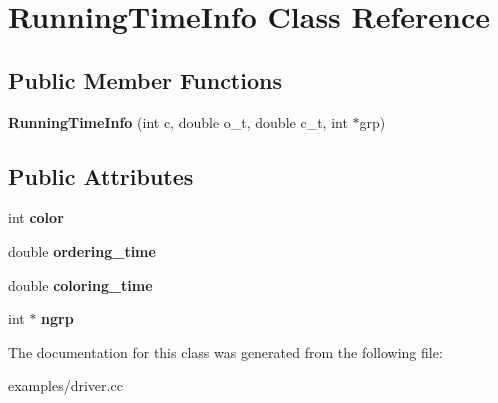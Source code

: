\hypertarget{classRunningTimeInfo}{
\section{RunningTimeInfo Class Reference}
\label{classRunningTimeInfo}
}
\subsection*{Public Member Functions}
\begin{DoxyCompactItemize}
\item 
\hypertarget{classRunningTimeInfo_a05cd38673e446b2e6c19fa046cc922eb}{
{\bfseries RunningTimeInfo} (int c, double o\_\-t, double c\_\-t, int $\ast$grp)}
\label{classRunningTimeInfo_a05cd38673e446b2e6c19fa046cc922eb}

\end{DoxyCompactItemize}
\subsection*{Public Attributes}
\begin{DoxyCompactItemize}
\item 
\hypertarget{classRunningTimeInfo_a00617e5bffda55064c3f99a200c9556d}{
int {\bfseries color}}
\label{classRunningTimeInfo_a00617e5bffda55064c3f99a200c9556d}

\item 
\hypertarget{classRunningTimeInfo_aa53698235638e25f25129fd238844a37}{
double {\bfseries ordering\_\-time}}
\label{classRunningTimeInfo_aa53698235638e25f25129fd238844a37}

\item 
\hypertarget{classRunningTimeInfo_a708e9f967d88e666053ce48b40f5a771}{
double {\bfseries coloring\_\-time}}
\label{classRunningTimeInfo_a708e9f967d88e666053ce48b40f5a771}

\item 
\hypertarget{classRunningTimeInfo_a0d549de50aff87a8c992839b28ec6491}{
int $\ast$ {\bfseries ngrp}}
\label{classRunningTimeInfo_a0d549de50aff87a8c992839b28ec6491}

\end{DoxyCompactItemize}


The documentation for this class was generated from the following file:\begin{DoxyCompactItemize}
\item 
examples/driver.cc\end{DoxyCompactItemize}
